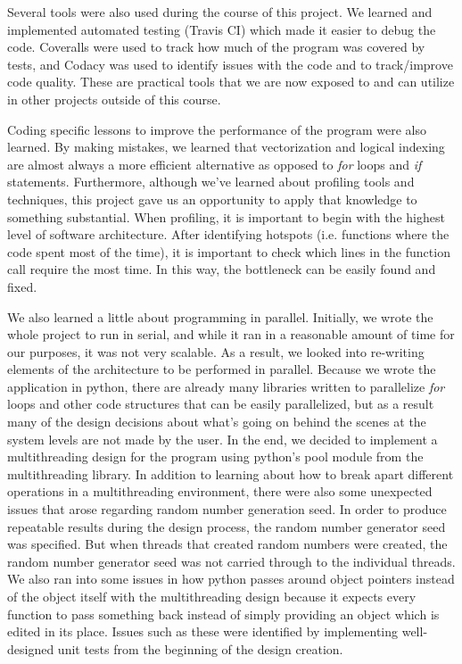 \documentclass{article}
\begin{document}
Several tools were also used during the course of this project. We learned and
implemented automated testing (Travis CI) which made it easier to debug the code.
Coveralls were used to track how much of the program was covered by tests, and
Codacy was used to identify issues with the code and to track/improve code
quality. These are practical tools that we are now exposed to and can utilize
in other projects outside of this course.

Coding specific lessons to improve the performance of the program were also
learned. By making mistakes, we learned that vectorization and logical
indexing are almost always a more efficient alternative as opposed to
\textit{for} loops and \textit{if} statements. Furthermore, although we've learned about
profiling tools and techniques, this project gave us an opportunity to apply
that knowledge to something substantial. When profiling, it is important to
begin with the highest level of software architecture. After identifying
hotspots (i.e. functions where the code spent most of the time), it is
important to check which lines in the function call require the most time.
In this way, the bottleneck can be easily found and fixed.

We also learned a little about programming in parallel. Initially, we wrote the
whole project to run in serial, and while it ran in a reasonable amount of time
for our purposes, it was not very scalable. As a result, we looked into
re-writing elements of the architecture to be performed in parallel. Because we
wrote the application in python, there are already many libraries written to
parallelize \textit{for} loops and other code structures that can be easily parallelized,
but as a result many of the design decisions about what's going on behind the
scenes at the system levels are not made by the user. In the end, we decided to
implement a multithreading design for the program using python's
pool module from the multithreading library. In addition to learning about how
to break apart different operations in a multithreading environment, there were
also some unexpected issues that arose regarding random number generation seed.
In order to produce repeatable results during the design process, the random
number generator seed was specified. But when threads that created random
numbers were created, the random number generator seed was not carried through
to the individual threads. We also ran into some issues in how python passes
around object pointers instead of the object itself with the multithreading
design because it expects every function to pass something back instead of
simply providing an object which is edited in its place. Issues such as these
were identified by implementing well-designed unit tests from the beginning of
the design creation.
\end{document}
